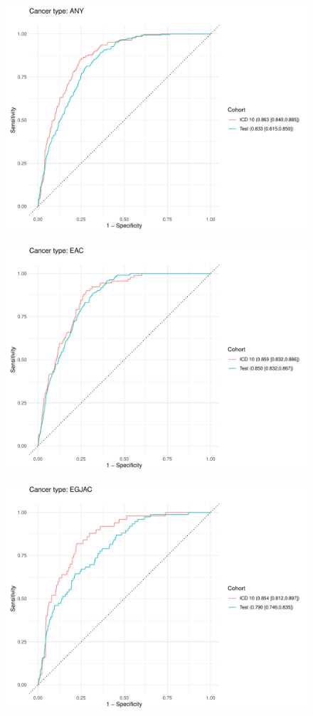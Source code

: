 \documentclass[english]{article}
\begin{document}
\begin{figure}[h]
\centering
\includegraphics[width=0.8\linewidth]{icd10/roc_ANY_representative.pdf}
\end{figure}
\begin{figure}[h]
\centering
\includegraphics[width=0.8\linewidth]{icd10/roc_EAC_representative.pdf}
\end{figure}
\begin{figure}[h]
\centering
\includegraphics[width=0.8\linewidth]{icd10/roc_EGJAC_representative.pdf}
\end{figure}
\end{document}
